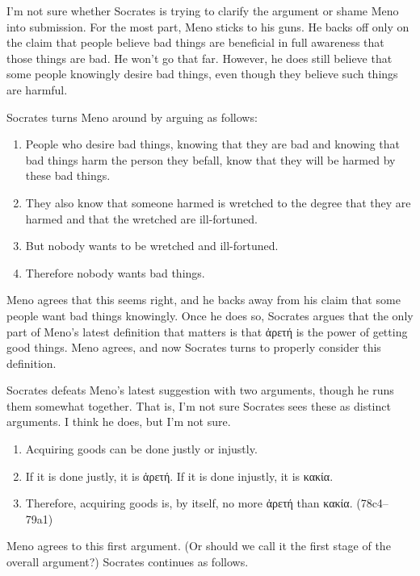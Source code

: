 \documentclass[11pt]{article}
\begin{document}
I'm not sure whether Socrates is trying to clarify the argument or shame Meno into submission. For the most part, Meno sticks to his guns. He backs off only on the claim that people believe bad things are beneficial in full awareness that those things are bad. He won't go that far. However, he does still believe that some people knowingly desire bad things, even though they believe such things are harmful.

Socrates turns Meno around by arguing as follows:

\begin{enumerate}
    \item People who desire bad things, knowing that they are bad and knowing that bad things harm the person they befall, know that they will be harmed by these bad things.
    \item They also know that someone harmed is wretched to the degree that they are harmed and that the wretched are ill-fortuned.
    \item But nobody wants to be wretched and ill-fortuned.
    \item Therefore nobody wants bad things.
\end{enumerate}

Meno agrees that this seems right, and he backs away from his claim that some people want bad things knowingly. Once he does so, Socrates argues that the only part of Meno's latest definition that matters is that {\g ἀρετή} is the power of getting good things. Meno agrees, and now Socrates turns to properly consider this definition.

Socrates defeats Meno's latest suggestion with two arguments, though he runs them somewhat together. That is, I'm not sure Socrates sees these as distinct arguments. I think he does, but I'm not sure.

\begin{enumerate}
    \item Acquiring goods can be done justly or injustly.
    \item If it is done justly, it is {\g ἀρετή}. If it is done injustly, it is {\g κακία}.
    \item Therefore, acquiring goods is, by itself, no more {\g ἀρετή} than {\g κακία}. (78c4--79a1)
\end{enumerate}

Meno agrees to this first argument. (Or should we call it the first stage of the overall argument?) Socrates continues as follows.
\end{document}
